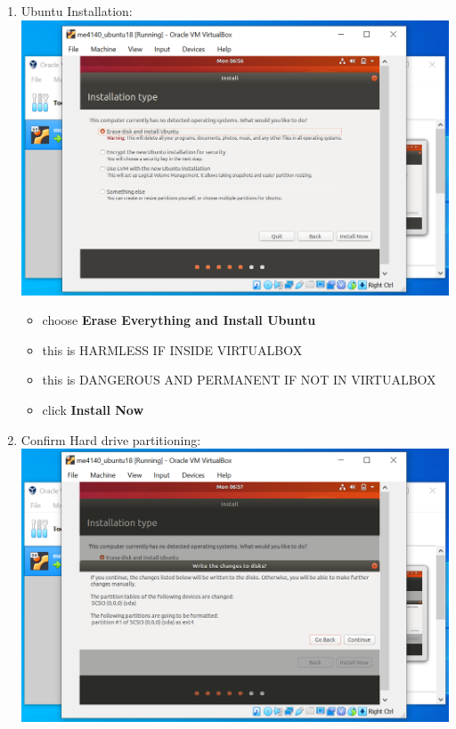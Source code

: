 \documentclass[12pt]{article}
\newcommand{\R}{\color{red}}
\newcommand{\B}{\color{blue}}
\begin{document}
\begin{description}
\begin{description}
\begin{enumerate}
\vspace{5mm} 
\newpage
\item Ubuntu Installation: \vspace{5mm} \\
      		\hspace*{-2.5cm}\includegraphics[scale=.6]{Capture16.png}\\
             \begin{itemize}
                    
                 \item choose {\bf Erase Everything and Install Ubuntu} 
                 \item this is {\B HARMLESS IF INSIDE VIRTUALBOX}
                 \item this is {\R DANGEROUS AND PERMANENT IF NOT IN VIRTUALBOX}
                 \item click {\bf Install Now}

            \end{itemize}

\vspace{5mm} 
\item Confirm Hard drive partitioning: \vspace{5mm} \\
      		\hspace*{-2.5cm}\includegraphics[scale=.6]{Capture17.png}
      		 \begin{itemize}
                    

\end{itemize}
\end{enumerate}
\end{description}
\end{description}
\end{document}
